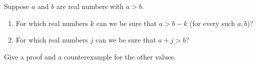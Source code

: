 Suppose $a$ and $b$ are real numbers with $a>b$.
\begin{enumerate}
\item[(a)] For which real numbers $k$ can we be sure that $a>b-k$ (for every such $a,b$)?
\item[(b)] For which real numbers $j$ can we be sure that $a+j>b$?
\end{enumerate}
Give a proof and a counterexample for the other values.
